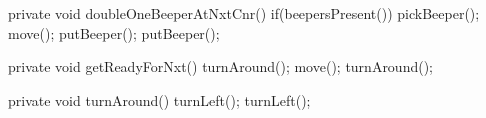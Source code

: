 \begin{sloppypar}
\begin{lstcodelong}[caption=ပထမစမ်းကြည့်ပုံ, label={lst:DoubleBeeperPileFull}]
{        private void doubleOneBeeperAtNxtCnr() {
                if(beepersPresent()) {
                        pickBeeper();
                }
                move();
                putBeeper();
                putBeeper();
        }

        private void getReadyForNxt() {
                turnAround();
                move();
                turnAround();
        }

        private void turnAround() {
                turnLeft();
                turnLeft();
        }
}
\end{lstcodelong}
\end{sloppypar}

